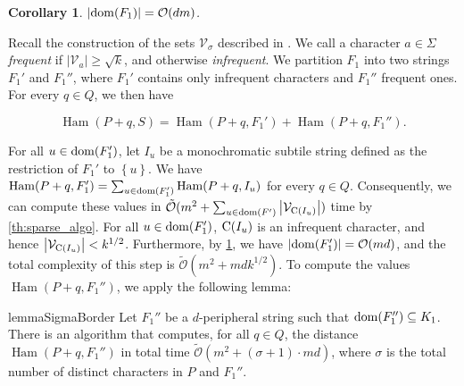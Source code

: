\documentclass[11pt, letterpaper]{article}
\theoremstyle{plain}
\newtheorem{corollary}[fact]{Corollary}
\theoremstyle{definition}
\theoremstyle{remark}
\renewcommand{\O}{\mathcal{O}}
\newcommand{\tO}{\tilde{\mathcal{O}}}
\newcommand{\V}{\mathcal{V}}
\newcommand{\set}[1]{\left\lbrace #1 \right\rbrace}
\DeclareMathOperator*{\Ham}{Ham}
\newcommand{\absolute}[1]{\left\lvert#1\right\rvert}
\begin{document}
\begin{corollary}\label{cor:area_F}
$\absolute{\d{F_1}} = \O(dm)$. 
\end{corollary}

Recall the construction of the sets $\V_\sigma$ described in . We call a character $a \in \Sigma$ \emph{frequent} if $\absolute{\V_a} \ge \sqrt{k}$, and otherwise \emph{infrequent}. We partition $F_1$ into two strings $F_1'$ and $F_1''$, where $F_1'$ contains only infrequent characters and $F_1''$ frequent ones. For every $q \in Q$, we then have 

\[\Ham(P + q, S) = \Ham(P + q, F_1') + \Ham(P + q, F_1'').\]

For all $u \in \operatorname*{dom}(F_1')$, let $I_u$ be a monochromatic subtile string defined as the restriction of $F_1'$ to $\set{u}$. 
We have $\Ham(P + q, F_1') = \sum_{u \in \d{F_1'}} \Ham(P + q, I_u)$ for every $q \in Q$. 
Consequently, we can compute these values in $\tO(m^2 + \sum_{u \in \d{F'}} \absolute{\V_{\getchar{I_u}}})$ time by \cref{th:sparse_algo}. 
For all $u \in \operatorname*{dom}(F_1')$, $\operatorname*{C}(I_u)$ is an infrequent character, and hence $\absolute{\V_{\getchar{I_u}}} < k^{1/2}$. 
Furthermore, by \cref{cor:area_F}, we have $\absolute{\d{F_1'}} = \O(md)$, and the total complexity of this step is $\tO(m^2 + mdk^{1/2})$. 
To compute the values $\Ham(P + q, F_1'')$, we apply the following lemma:

\begin{restatable}{lemma}{SigmaBorder}\label{lm:sigma_border}
Let $F_1''$ be a $d$-peripheral string such that $\operatorname*{dom}(F_1'') \subseteq K_1$. There is an algorithm that computes, for all $q \in Q$, the distance $\Ham(P + q, F_1'')$ in total time $\tO(m^2 + (\sigma+1) \cdot md)$, where $\sigma$ is the total number of distinct characters in $P$ and $F_1''$.
\end{restatable}
\end{document}
